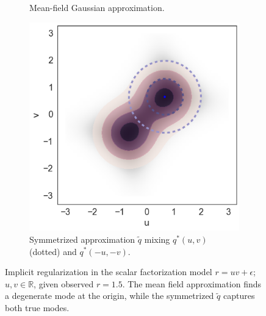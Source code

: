 \documentclass{article}
\begin{document}
\begin{figure}[t]
\begin{subfigure}[t]{.3\textwidth}
\caption{Mean-field Gaussian approximation.}
\end{subfigure}
\begin{subfigure}[t]{.3\textwidth}
\includegraphics[width=\textwidth]{signflip_symmetric_posterior}
\caption{Symmetrized approximation $\tilde{q}$ mixing $q^*(u,v)$ (dotted) and $q^*(-u,-v)$.}
\end{subfigure}
\caption{Implicit regularization in the scalar factorization model $r = uv +
  \epsilon$; $u,v \in \mathbb{R}$, given observed
  $r=1.5$. The mean field approximation finds a degenerate mode at the
origin, while the symmetrized $\tilde{q}$ captures both true modes.}
\label{fig:signflip_demo}
\end{figure}
\end{document}
